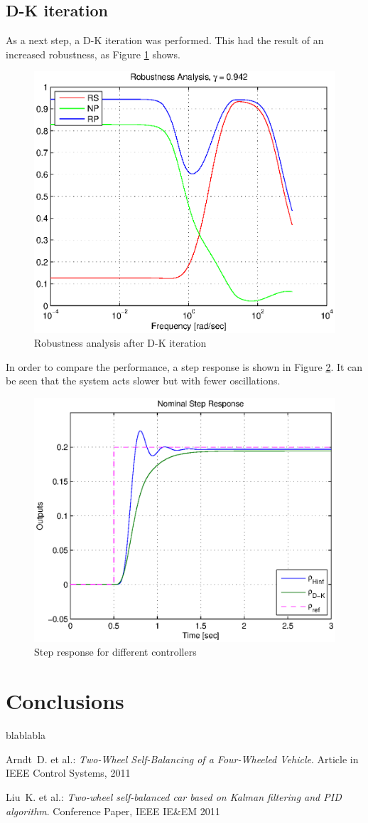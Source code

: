 \documentclass[conference]{IEEEtran}
\begin{document}
\subsection{D-K iteration}

As a next step, a D-K iteration was performed. This had the result of an increased robustness, as Figure \ref{figure:RP_after_DK} shows.

\begin{figure}[h]
\centering
  \includegraphics[width=.47\textwidth]{pics/RP_after_DK} 
  \caption{Robustness analysis after D-K iteration}  
  \label{figure:RP_after_DK}
\end{figure}

In order to compare the performance, a step response is shown in Figure \ref{figure:step_comp_02}. It can be seen that the system acts slower but with fewer oscillations. 


\begin{figure}[h]
\centering
  \includegraphics[width=.47\textwidth]{pics/step_comp_02} 
  \caption{Step response for different controllers}  
  \label{figure:step_comp_02}
\end{figure}


\section{Conclusions}

blablabla

 
 
 
\begin{thebibliography}{1}

 {\sc Arndt~D. et al.}: {\it Two-Wheel Self-Balancing of a Four-Wheeled Vehicle}. Article in IEEE Control Systems, 2011

 {\sc Liu~K. et al.}: {\it Two-wheel self-balanced car based on Kalman filtering and PID algorithm}. Conference Paper, IEEE IE\&EM 2011


\end{thebibliography}


\end{document}
